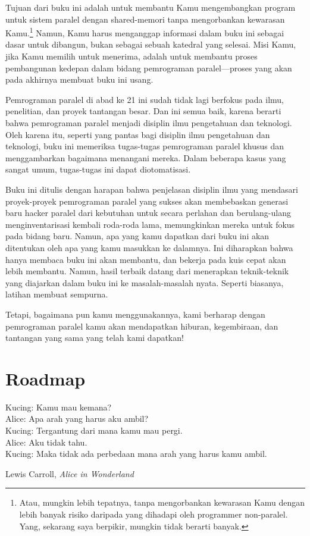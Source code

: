
%

Tujuan dari buku ini adalah untuk membantu Kamu mengembangkan
program untuk sistem paralel dengan shared-memori tanpa mengorbankan
kewarasan Kamu.\footnote{
	Atau, mungkin lebih tepatnya, tanpa mengorbankan kewarasan Kamu
	dengan lebih banyak risiko daripada yang dihadapi oleh programmer
	non-paralel.
	Yang, sekarang saya berpikir, mungkin tidak berarti banyak.}
Namun, Kamu harus menganggap informasi dalam buku ini sebagai
dasar untuk dibangun, bukan sebagai sebuah katedral yang selesai.
Misi Kamu, jika Kamu memilih untuk menerima, adalah untuk membantu
proses pembangunan kedepan dalam bidang pemrograman paralel---proses
yang akan pada akhirnya membuat buku ini usang.

Pemrograman paralel di abad ke 21 ini sudah tidak lagi berfokus pada
ilmu, penelitian, dan proyek tantangan besar.
Dan ini semua baik, karena berarti bahwa pemrograman paralel menjadi
disiplin ilmu pengetahuan dan teknologi.
Oleh karena itu, seperti yang pantas bagi disiplin ilmu pengetahuan dan teknologi,
buku ini memeriksa tugas-tugas pemrograman paralel khusus dan menggambarkan
bagaimana menangani mereka.
Dalam beberapa kasus yang sangat umum, tugas-tugas ini dapat diotomatisasi.

Buku ini ditulis dengan harapan bahwa penjelasan disiplin ilmu
yang mendasari proyek-proyek pemrograman paralel yang sukses akan membebaskan
generasi baru hacker paralel dari kebutuhan untuk secara perlahan dan
berulang-ulang menginventarisasi kembali roda-roda lama, memungkinkan mereka
untuk fokus pada bidang baru.
Namun, apa yang kamu dapatkan dari buku ini akan ditentukan oleh apa yang
kamu masukkan ke dalamnya.
Ini diharapkan bahwa hanya membaca buku ini akan membantu,
dan bekerja pada kuis cepat akan lebih membantu.
Namun, hasil terbaik datang dari menerapkan teknik-teknik yang diajarkan
dalam buku ini ke masalah-masalah nyata.
Seperti biasanya, latihan membuat sempurna.

Tetapi, bagaimana pun kamu menggunakannya, kami berharap dengan pemrograman
paralel kamu akan mendapatkan hiburan, kegembiraan, dan tantangan yang sama
yang telah kami dapatkan!

\section{Roadmap}
\label{sec:howto:Roadmap}
%
\epigraph{Kucing:
		Kamu mau kemana? \\
	  Alice:
		Apa arah yang harus aku ambil? \\
	  Kucing:
		Tergantung dari mana kamu mau pergi. \\
	  Alice:
		Aku tidak tahu. \\
	  Kucing:
		Maka tidak ada perbedaan mana arah yang harus kamu ambil.}
	{Lewis Carroll, \emph{Alice in Wonderland}}	

